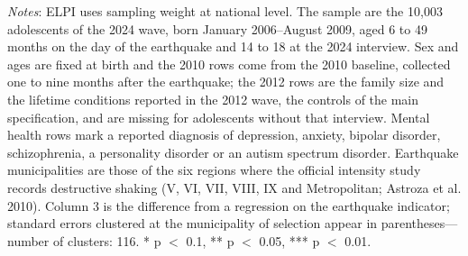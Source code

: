 \begin{table}[htbp]
\begin{minipage}{360pt}
{\textit{Notes}: ELPI uses sampling weight at national level. The sample are the 10,003 adolescents of the 2024 wave, born January 2006--August 2009, aged 6 to 49 months on the day of the earthquake and 14 to 18 at the 2024 interview. Sex and ages are fixed at birth and the 2010 rows come from the 2010 baseline, collected one to nine months after the earthquake; the 2012 rows are the family size and the lifetime conditions reported in the 2012 wave, the controls of the main specification, and are missing for adolescents without that interview. Mental health rows mark a reported diagnosis of depression, anxiety, bipolar disorder, schizophrenia, a personality disorder or an autism spectrum disorder. Earthquake municipalities are those of the six regions where the official intensity study records destructive shaking (V, VI, VII, VIII, IX and Metropolitan; Astroza et al. 2010). Column 3 is the difference from a regression on the earthquake indicator; standard errors clustered at the municipality of selection appear in parentheses---number of clusters: 116. * p $<$ 0.1, ** p $<$ 0.05, *** p $<$ 0.01.
\par}
\end{minipage}
\end{table}
